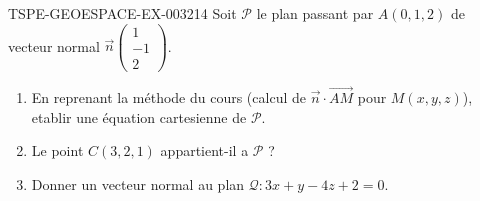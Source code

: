 \begin{exercice}{TSPE-GEOESPACE-EX-003}{2}{14}
Soit $\mathcal{P}$ le plan passant par $A(0,1,2)$ de vecteur normal $\vec{n}\begin{pmatrix}1\\-1\\2\end{pmatrix}$.
\begin{enumerate}
  \item En reprenant la méthode du cours (calcul de $\vec{n}\cdot\vec{AM}$ pour $M(x,y,z)$), etablir une équation cartesienne de $\mathcal{P}$.
  \item Le point $C(3,2,1)$ appartient-il a $\mathcal{P}$ ?
  \item Donner un vecteur normal au plan $\mathcal{Q}: 3x+y-4z+2=0$.
\end{enumerate}
\end{exercice}
